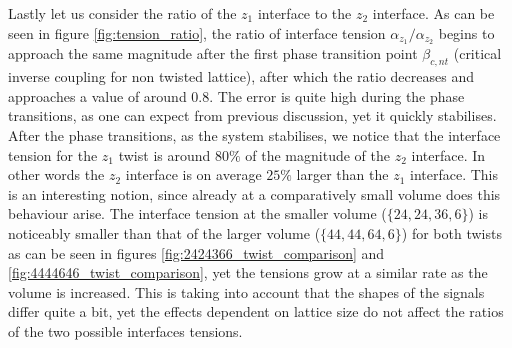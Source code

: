 \documentclass[english,twoside,openright]{UH_TCM_MSc}
\begin{document}
Lastly let us consider the ratio of the $z_1$ interface to the $z_2$ interface. As can be seen in figure \ref{fig:tension_ratio}, the ratio of interface tension $\alpha_{z_1}/\alpha_{z_2}$ begins to approach the same magnitude after the first phase transition point $\beta_{c,nt}$ (critical inverse coupling for non twisted lattice), after which the ratio decreases and approaches a value of around $0.8$. The error is quite high during the phase transitions, as one can expect from previous discussion, yet it quickly stabilises. After the phase transitions, as the system stabilises, we notice that the interface tension for the $z_1$ twist is around $80\%$ of the magnitude of the $z_2$ interface. In other words the $z_2$ interface is on average $25\%$ larger than the $z_1$ interface. This is an interesting notion, since already at a comparatively small volume does this behaviour arise. The interface tension at the smaller volume ($\{24,24,36,6\}$) is noticeably smaller than that of the larger volume ($\{44,44,64,6\}$) for both twists as can be seen in figures \ref{fig:2424366_twist_comparison} and \ref{fig:4444646_twist_comparison}, yet the tensions grow at a similar rate as the volume is increased. This is taking into account that the shapes of the signals differ quite a bit, yet the effects dependent on lattice size do not affect the ratios of the two possible interfaces tensions. 
\end{document}
